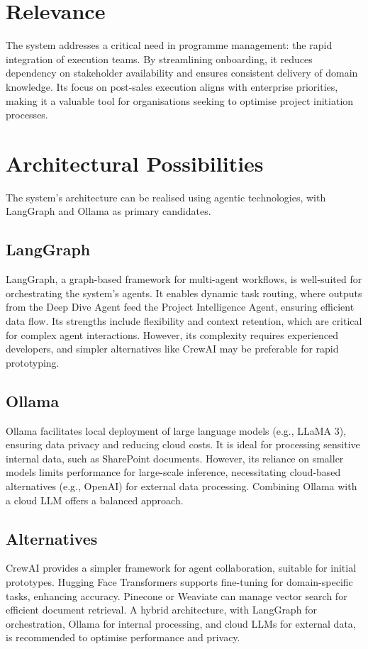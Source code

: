 \documentclass{article}
\begin{document}
\section{Relevance}
The system addresses a critical need in programme management: the rapid integration of execution teams. By streamlining onboarding, it reduces dependency on stakeholder availability and ensures consistent delivery of domain knowledge. Its focus on post-sales execution aligns with enterprise priorities, making it a valuable tool for organisations seeking to optimise project initiation processes.

\section{Architectural Possibilities}
The system’s architecture can be realised using agentic technologies, with LangGraph and Ollama as primary candidates.

\subsection{LangGraph}
LangGraph, a graph-based framework for multi-agent workflows, is well-suited for orchestrating the system’s agents. It enables dynamic task routing, where outputs from the Deep Dive Agent feed the Project Intelligence Agent, ensuring efficient data flow. Its strengths include flexibility and context retention, which are critical for complex agent interactions. However, its complexity requires experienced developers, and simpler alternatives like CrewAI may be preferable for rapid prototyping.

\subsection{Ollama}
Ollama facilitates local deployment of large language models (e.g., LLaMA 3), ensuring data privacy and reducing cloud costs. It is ideal for processing sensitive internal data, such as SharePoint documents. However, its reliance on smaller models limits performance for large-scale inference, necessitating cloud-based alternatives (e.g., OpenAI) for external data processing. Combining Ollama with a cloud LLM offers a balanced approach.

\subsection{Alternatives}
CrewAI provides a simpler framework for agent collaboration, suitable for initial prototypes. Hugging Face Transformers supports fine-tuning for domain-specific tasks, enhancing accuracy. Pinecone or Weaviate can manage vector search for efficient document retrieval. A hybrid architecture, with LangGraph for orchestration, Ollama for internal processing, and cloud LLMs for external data, is recommended to optimise performance and privacy.
\end{document}
